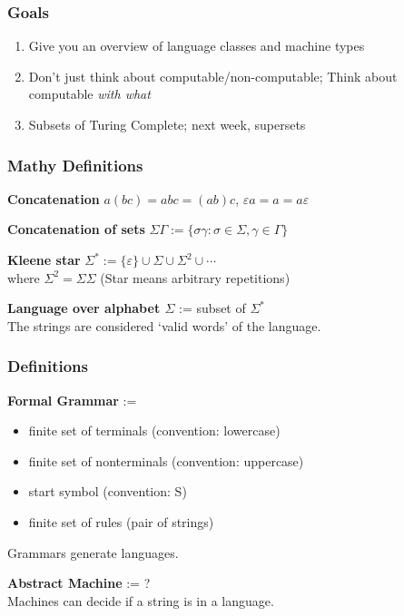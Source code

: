 \documentclass[languages_and_machines.tex]{subfiles}
\begin{document}
\begin{frame}
  \frametitle{Goals}
  \begin{enumerate}
  \item Give you an overview of language classes and machine types
  \item Don't just think about computable/non-computable; Think about computable \textit{with what}
  \item Subsets of Turing Complete; next week, supersets
  \end{enumerate}
\end{frame}

\begin{frame}

  \frametitle{Mathy Definitions}

  \textbf{Concatenation} \pause \(a(bc) = abc = (ab)c\)\pause, \(\varepsilon a = a = a \varepsilon\)

  \pause

  \textbf{Concatenation of sets} \(\Sigma \Gamma := \{\sigma \gamma : \sigma \in \Sigma, \gamma \in \Gamma\}\)

  \pause

  \textbf{Kleene star} \(\Sigma^* := \{\varepsilon\} \cup \Sigma \cup \Sigma^2 \cup \dotsb\) \\
  where \(\Sigma^2 = \Sigma \Sigma\) (Star means arbitrary repetitions)

  \pause

  \textbf{Language over alphabet \(\Sigma\)} := subset of \(\Sigma^*\)
  \\ The strings are considered `valid words' of the language.

\end{frame}

\begin{frame}
  \frametitle{Definitions}

  \textbf{Formal Grammar} :=

\begin{itemize}
  \item finite set of terminals (convention: lowercase)
  \item finite set of nonterminals (convention: uppercase)
  \item start symbol (convention: S)
  \item finite set of rules (pair of strings)
  \end{itemize}
  
Grammars generate languages.

  \textbf{Abstract Machine} := ?
  \\ Machines can decide if a string is in a language.

\end{frame}
\end{document}
